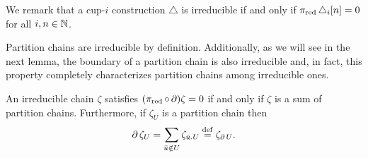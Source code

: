 We remark that a cup-$i$ construction $\triangle$ is irreducible if and only if $\operatorname{\pi_{\text{red}}}\triangle_i[n] = 0$ for all $i,n \in \mathbb{N}$.

Partition chains are irreducible by definition.
Additionally, as we will see in the next lemma, the boundary of a partition chain is also irreducible and, in fact, this property completely characterizes partition chains among irreducible ones.

\begin{lemma}\label{l:partition chains}
	An irreducible chain $\zeta$ satisfies $(\operatorname{\pi_{\text{red}}} \circ \operatorname{\partial})\zeta = 0$ if and only if $\zeta$ is a sum of partition chains.
	Furthermore, if $\zeta_U$ is a partition chain then
	\begin{equation}\label{eq:boundary_partition_chain}
		\operatorname{\partial} \zeta_U = \sum_{\bar u \notin U} \zeta_{\bar u.U} \stackrel{\mathrm{def}}{=} \zeta_{\operatorname{\partial} U}.
	\end{equation}
\end{lemma}

